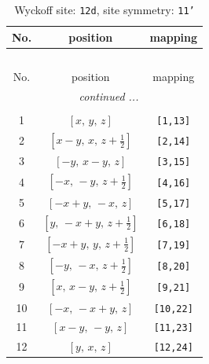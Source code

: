 \documentclass[fleqn,8pt]{jsarticle}
\begin{document}
\begin{longtable}{ccc}
\caption{Wyckoff site: {\tt 12d}, site symmetry: {\tt 11'}}
 \\
 \hline \hline
No. & position & mapping \\ \hline \endfirsthead

\multicolumn{2}{l}{\tablename\ \thetable{}} \\
 \hline \hline
No. & position & mapping \\ \hline \endhead

 \hline \hline
\multicolumn{2}{r}{\footnotesize\it continued ...} \\ \endfoot

 \hline \hline
\multicolumn{2}{r}{} \\ \endlastfoot

1 & $\left[ x,\, y,\, z \right]$ & {\tt [1,13]} \\ \hline
2 & $\left[ x - y,\, x,\, z + \frac{1}{2} \right]$ & {\tt [2,14]} \\ \hline
3 & $\left[ - y,\, x - y,\, z \right]$ & {\tt [3,15]} \\ \hline
4 & $\left[ - x,\, - y,\, z + \frac{1}{2} \right]$ & {\tt [4,16]} \\ \hline
5 & $\left[ - x + y,\, - x,\, z \right]$ & {\tt [5,17]} \\ \hline
6 & $\left[ y,\, - x + y,\, z + \frac{1}{2} \right]$ & {\tt [6,18]} \\ \hline
7 & $\left[ - x + y,\, y,\, z + \frac{1}{2} \right]$ & {\tt [7,19]} \\ \hline
8 & $\left[ - y,\, - x,\, z + \frac{1}{2} \right]$ & {\tt [8,20]} \\ \hline
9 & $\left[ x,\, x - y,\, z + \frac{1}{2} \right]$ & {\tt [9,21]} \\ \hline
10 & $\left[ - x,\, - x + y,\, z \right]$ & {\tt [10,22]} \\ \hline
11 & $\left[ x - y,\, - y,\, z \right]$ & {\tt [11,23]} \\ \hline
12 & $\left[ y,\, x,\, z \right]$ & {\tt [12,24]} \\
\end{longtable}
\end{document}
